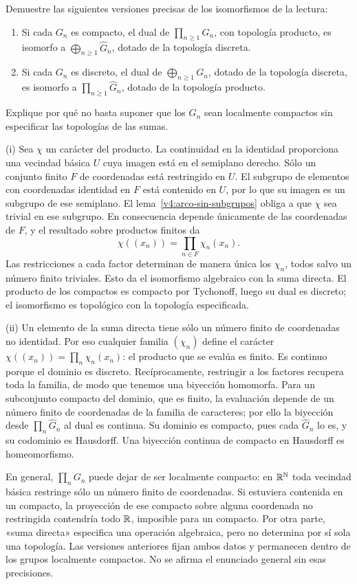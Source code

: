\begin{ejercicio}\label{ej:v4-l25-3}
Demuestre las siguientes versiones precisas de los isomorfismos de la lectura:
\begin{enumerate}
\item Si cada $G_n$ es compacto, el dual de $\prod_{n\ge1}G_n$, con topología producto, es isomorfo a $\bigoplus_{n\ge1}\widehat G_n$, dotado de la topología discreta.
\item Si cada $G_n$ es discreto, el dual de $\bigoplus_{n\ge1}G_n$, dotado de la topología discreta, es isomorfo a $\prod_{n\ge1}\widehat G_n$, dotado de la topología producto.
\end{enumerate}
Explique por qué no basta suponer que los $G_n$ sean localmente compactos sin especificar las topologías de las sumas.
\end{ejercicio}
\begin{solucion}
(i) Sea $\chi$ un carácter del producto. La continuidad en la identidad proporciona una vecindad básica $U$ cuya imagen está en el semiplano derecho. Sólo un conjunto finito $F$ de coordenadas está restringido en $U$. El subgrupo de elementos con coordenadas identidad en $F$ está contenido en $U$, por lo que su imagen es un subgrupo de ese semiplano. El lema~\ref{v4:arco-sin-subgrupos} obliga a que $\chi$ sea trivial en ese subgrupo. En consecuencia depende únicamente de las coordenadas de $F$, y el resultado sobre productos finitos da
\[
 \chi((x_n))=\prod_{n\in F}\chi_n(x_n).
\]
Las restricciones a cada factor determinan de manera única los $\chi_n$, todos salvo un número finito triviales. Esto da el isomorfismo algebraico con la suma directa. El producto de los compactos es compacto por Tychonoff, luego su dual es discreto; el isomorfismo es topológico con la topología especificada.

(ii) Un elemento de la suma directa tiene sólo un número finito de coordenadas no identidad. Por eso cualquier familia $(\chi_n)$ define el carácter
$\chi((x_n))=\prod_n\chi_n(x_n)$: el producto que se evalúa es finito. Es continuo porque el dominio es discreto. Recíprocamente, restringir a los factores recupera toda la familia, de modo que tenemos una biyección homomorfa. Para un subconjunto compacto del dominio, que es finito, la evaluación depende de un número finito de coordenadas de la familia de caracteres; por ello la biyección desde $\prod_n\widehat G_n$ al dual es continua. Su dominio es compacto, pues cada $\widehat G_n$ lo es, y su codominio es Hausdorff. Una biyección continua de compacto en Hausdorff es homeomorfismo.

En general, $\prod_nG_n$ puede dejar de ser localmente compacto: en $\mathbb R^{\mathbb N}$ toda vecindad básica restringe sólo un número finito de coordenadas. Si estuviera contenida en un compacto, la proyección de ese compacto sobre alguna coordenada no restringida contendría todo $\mathbb R$, imposible para un compacto. Por otra parte, «suma directa» especifica una operación algebraica, pero no determina por sí sola una topología. Las versiones anteriores fijan ambos datos y permanecen dentro de los grupos localmente compactos. No se afirma el enunciado general sin esas precisiones.
\end{solucion}

